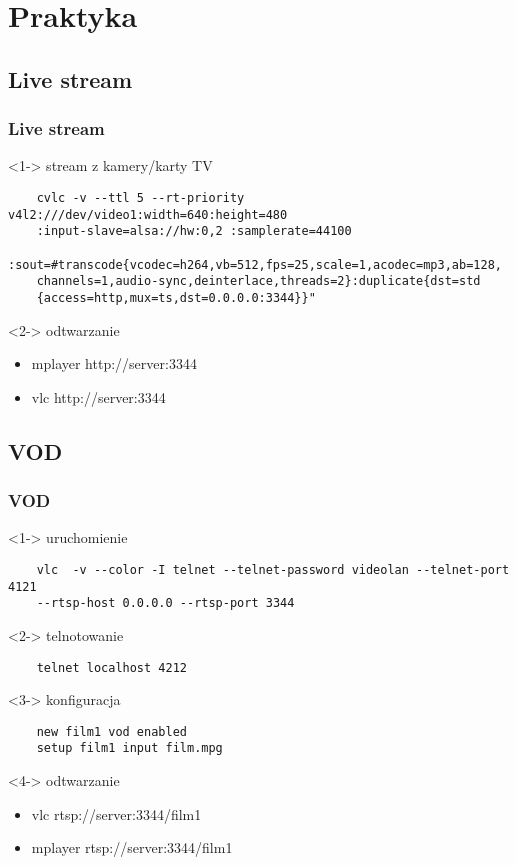 \documentclass[10pt]{beamer}
\begin{document}
\section{Praktyka}
\subsection{Live stream}
\begin{frame}[fragile]
	\frametitle{Live stream}
	\begin{block}<1->
	{stream z kamery/karty TV}
	\footnotesize
	\begin{verbatim}
	cvlc -v --ttl 5 --rt-priority v4l2:///dev/video1:width=640:height=480
	:input-slave=alsa://hw:0,2 :samplerate=44100
	:sout=#transcode{vcodec=h264,vb=512,fps=25,scale=1,acodec=mp3,ab=128,
	channels=1,audio-sync,deinterlace,threads=2}:duplicate{dst=std
	{access=http,mux=ts,dst=0.0.0.0:3344}}"
	\end{verbatim}
	\end{block}
	\begin{block}<2->
	{odtwarzanie}
	\begin{itemize}
		\item mplayer http://server:3344
		\item vlc http://server:3344
	\end{itemize}
	\end{block}
\end{frame}
\subsection{VOD}
\begin{frame}[fragile]
	\frametitle{VOD}
	\begin{block}<1->
	{uruchomienie}
	\footnotesize
	\begin{verbatim}
	vlc  -v --color -I telnet --telnet-password videolan --telnet-port 4121
	--rtsp-host 0.0.0.0 --rtsp-port 3344
	\end{verbatim}
	\end{block}
	\begin{block}<2->
	{telnotowanie}
	\begin{verbatim}
	telnet localhost 4212
	\end{verbatim}
	\end{block}
	\begin{block}<3->
	{konfiguracja}
	\begin{verbatim}
	new film1 vod enabled
	setup film1 input film.mpg
	\end{verbatim}
	\end{block}
	\begin{block}<4->
	{odtwarzanie}
	\begin{itemize}
		\item vlc rtsp://server:3344/film1
		\item mplayer rtsp://server:3344/film1
	\end{itemize}
	\end{block}
\end{frame}
\end{document}
